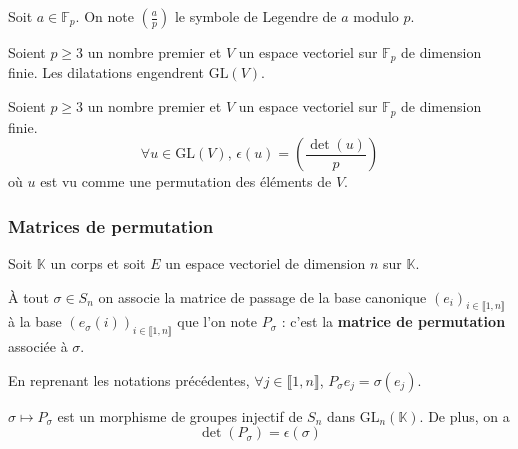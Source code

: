 
	\begin{notation}
		Soit $a \in \mathbb{F}_p$. On note $\left( \frac{a}{p} \right)$ le symbole de Legendre de $a$ modulo $p$.
	\end{notation}

	\begin{lemma}
		Soient $p \geq 3$ un nombre premier et $V$ un espace vectoriel sur $\mathbb{F}_p$ de dimension finie. Les dilatations engendrent $\mathrm{GL}(V)$.
	\end{lemma}


	\begin{theorem}
	  Soient $p \geq 3$ un nombre premier et $V$ un espace vectoriel sur $\mathbb{F}_p$ de dimension finie.
		\[ \forall u \in \mathrm{GL}(V), \, \epsilon(u) = \left( \frac{\det(u)}{p} \right) \]
		où $u$ est vu comme une permutation des éléments de $V$.
	\end{theorem}

	\subsubsection{Matrices de permutation}


	Soit $\mathbb{K}$ un corps et soit $E$ un espace vectoriel de dimension $n$ sur $\mathbb{K}$.

	\begin{definition}
		À tout $\sigma \in S_n$ on associe la matrice de passage de la base canonique $(e_i)_{i \in \llbracket 1, n \rrbracket}$ à la base $(e_\sigma(i))_{i \in \llbracket 1, n \rrbracket}$ que l'on note $P_{\sigma}$ : c'est la \textbf{matrice de permutation} associée à $\sigma$.
	\end{definition}

	\begin{remark}
		En reprenant les notations précédentes, $\forall j \in \llbracket 1, n \rrbracket$, $P_{\sigma} e_j = \sigma(e_j)$.
	\end{remark}

	\begin{proposition}
		$\sigma \mapsto P_{\sigma}$ est un morphisme de groupes injectif de $S_n$ dans $\mathrm{GL}_n(\mathbb{K})$. De plus, on a
		\[ \det(P_{\sigma}) = \epsilon(\sigma) \]
	\end{proposition}


